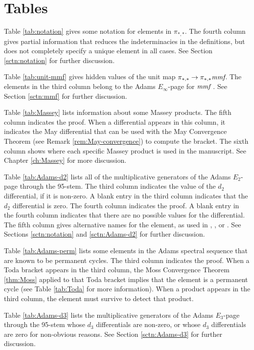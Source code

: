 \chapter{Tables}
\label{ch:table}

Table \ref{tab:notation} gives some notation for elements in
$\pi_{*,*}$.  The fourth column gives partial information that
reduces the indeterminacies in the definitions, but does not
completely specify a unique element in all cases.
See Section \ref{sctn:notation} for further discussion.

Table \ref{tab:unit-mmf} gives hidden values of the unit map
$\pi_{*,*} \rightarrow \pi_{*,*} \textit{mmf}$.
The elements in the third column belong to the
Adams $E_\infty$-page for $\textit{mmf}$ \cite{Isaksen09} \cite{Isaksen18}.
See Section \ref{sctn:mmf} for further discussion.

Table \ref{tab:Massey} lists information about some Massey products.
The fifth column indicates the proof.  When a differential appears
in this column, it indicates the May differential that can be used
with the May Convergence Theorem (see Remark \ref{rem:May-convergence})
to compute the bracket.  The sixth column
shows where each specific Massey product is used in the manuscript.
See Chapter \ref{ch:Massey} for more discussion.

Table \ref{tab:Adams-d2} lists all of the multiplicative generators 
of the Adams $E_2$-page through the 95-stem.  The third column indicates
the value of the $d_2$ differential, if it is non-zero.
A blank entry in the third column indicates that the $d_2$ differential
is zero.
The fourth column indicates the proof. A blank entry in the fourth column
indicates that there are no possible values for the differential.
The fifth column gives alternative names for the element, as used 
in \cite{Bruner97}, \cite{Isaksen14c}, or \cite{Tangora70a}.
See Sections \ref{sctn:notation} and
\ref{sctn:Adams-d2} for further discussion.

Table \ref{tab:Adams-perm} lists some elements in the 
Adams spectral sequence that are known to be permanent cycles.
The third column indicates the proof.  When a Toda bracket
appears in the third column, the Moss Convergence Theorem
\ref{thm:Moss} applied to that Toda bracket implies that the
element is a permanent cycle (see Table \ref{tab:Toda} for
more information).  When a product appears in the third column,
the element must survive to detect that product.

Table \ref{tab:Adams-d3} lists the multiplicative generators 
of the Adams $E_3$-page through the 95-stem
whose $d_3$ differentials are non-zero, or whose $d_3$ differentials
are zero for non-obvious reasons.
See Section \ref{sctn:Adams-d3} for further discussion.

